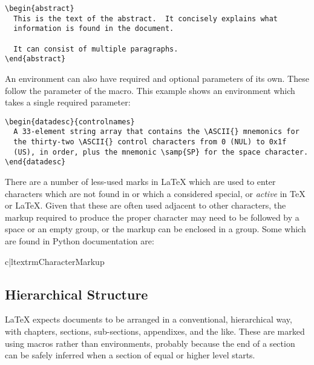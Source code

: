 \documentclass{howto}
\begin{document}
\begin{verbatim}
\begin{abstract}
  This is the text of the abstract.  It concisely explains what
  information is found in the document.

  It can consist of multiple paragraphs.
\end{abstract}
\end{verbatim}

    An environment can also have required and optional parameters of
    its own.  These follow the parameter of the  macro.
    This example shows an environment which takes a single required
    parameter:

\begin{verbatim}
\begin{datadesc}{controlnames}
  A 33-element string array that contains the \ASCII{} mnemonics for
  the thirty-two \ASCII{} control characters from 0 (NUL) to 0x1f
  (US), in order, plus the mnemonic \samp{SP} for the space character.
\end{datadesc}
\end{verbatim}

    There are a number of less-used marks in \LaTeX{} which are used
    to enter characters which are not found in \ASCII{} or which a
    considered special, or \emph{active} in \TeX{} or \LaTeX.  Given
    that these are often used adjacent to other characters, the markup
    required to produce the proper character may need to be followed
    by a space or an empty group, or the markup can be enclosed in a
    group.  Some which are found in Python documentation are:

\begin{tableii}{c|l}{textrm}{Character}{Markup}
\end{tableii}


  \subsection{Hierarchical Structure \label{latex-structure}}

    \LaTeX{} expects documents to be arranged in a conventional,
    hierarchical way, with chapters, sections, sub-sections,
    appendixes, and the like.  These are marked using macros rather
    than environments, probably because the end of a section can be
    safely inferred when a section of equal or higher level starts.
\end{document}
